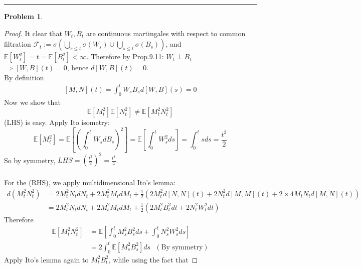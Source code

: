 \documentclass[a4paper, 10pt]{article}
\theoremstyle{definition}
\newtheorem{problem}{Problem}
\theoremstyle{hSol}
\begin{document}
\noindent\rule{16cm}{0.4pt}
\begin{problem}
\end{problem}
\begin{proof} It clear that $W_t, B_t$ are continuous martingales with respect to common filtration $\mathcal{F}_t:=\sigma(\bigcup_{s\leq t}\sigma(W_s) \cup \bigcup_{s\leq t}\sigma(B_s))$, and $\mathbb{E}\left[W_t^2\right] = t = \mathbb{E}\left[B_t^2\right] < \infty$. Therefore by Prop.9.11: $W_t \perp B_t$ $\Rightarrow [W,B](t) = 0$, hence $d[W,B](t) = 0$. \\
By definition
\begin{equation}
	\begin{split}
		[M,N](t) = \int_0^t W_s B_s d[W,B](s) =0
	\end{split}
\end{equation}
Now we show that 
$$
\mathbb{E}\left[M_t^2\right] \mathbb{E}\left[N_t^2\right] \ne \mathbb{E}\left[M_t^2 N_t^2\right]
$$
(LHS) is easy. Apply Ito isometry:
\begin{equation}
	\mathbb{E}\left[M_t^2\right] = \mathbb{E}\left[\left(\int_0^t W_s dB_s\right)^2\right] = \mathbb{E}\left[\int_0^t W_s^2 ds\right] = \int_0^t sds = \frac{t^2}{2}
\end{equation}
So by symmetry, $LHS = \left(\frac{t^2}{2}\right)^2 = \frac{t^4}{4}$.\\
~\\
For the (RHS), we apply multidimensional Ito's lemma:
\begin{equation}
	\begin{split}
		d(M_t^2N_t^2) 
		&=2 M_t^2 N_t dN_t + 2 M_t^2 M_t dM_t + \frac{1}{2}\left(2M_t^2 d[N,N](t) + 2N^2_t d[M,M](t) + 2\times4M_tN_t d[M,N](t)\right) \\
		&=2 M_t^2 N_t dN_t + 2 M_t^2 M_t dM_t + \frac{1}{2}\left(2M_t^2 B^2_t dt + 2N^2_t W^2_t dt\right)
	\end{split} 
\end{equation}
Therefore
\begin{equation}
	\begin{split}
		\mathbb{E}\left[M_t^2N_t^2 \right] &= \mathbb{E}\left[\int_0^t  M_s^2 B^2_s ds + \int_0^tN^2_s W^2_s ds \right]  \\
		&= 2 \int_0^t \mathbb{E}\left[ M_s^2 B^2_s\right] ds~~~(\text{By symmetry})
	\end{split}
\end{equation}
Apply Ito's lemma again to $M_t^2 B_t^2$, while using the fact that

\end{proof}
\end{document}

